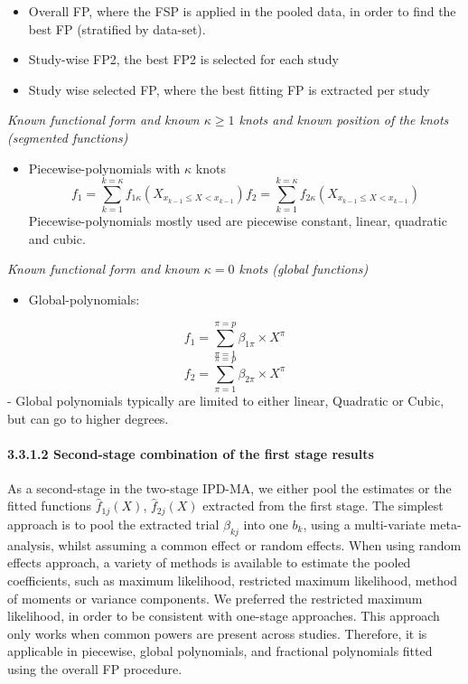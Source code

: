 \documentclass[14pt,]{article}
\providecommand{\tightlist}{%
  \setlength{\itemsep}{0pt}\setlength{\parskip}{0pt}}
\let\oldparagraph\paragraph
\renewcommand{\paragraph}[1]{\oldparagraph{#1}\mbox{}}
\begin{document}
\begin{itemize}
\tightlist
\item
  Overall FP, where the FSP is applied in the pooled data, in order to
  find the best FP (stratified by data-set).
\item
  Study-wise FP2, the best FP2 is selected for each study
\item
  Study wise selected FP, where the best fitting FP is extracted per
  study
\end{itemize}

\emph{Known functional form and known \(\kappa \geq 1\) knots and known
position of the knots (segmented functions)}

\begin{itemize}
\tightlist
\item
  Piecewise-polynomials with \(\kappa\) knots
  \[f_1 = \sum_{k =1}^{ k= \kappa}f_{1\kappa}(X_{x_{k-1} \leq X < x_{k-1}} ) f_2 =  \sum_{k =1}^{k= \kappa}f_{2\kappa}(X_{x_{k-1} \leq X < x_{k-1}} )\]
  Piecewise-polynomials mostly used are piecewise constant, linear,
  quadratic and cubic.
\end{itemize}

\emph{Known functional form and known \(\kappa = 0\) knots (global
functions)}

\begin{itemize}
\tightlist
\item
  Global-polynomials:
\end{itemize}

\[f_1 =  \sum_{\pi=1}^{\pi=p} \beta_{1\pi} \times X^{\pi}\]
\[ f_2 = \sum_{\pi=1}^{\pi=p} \beta_{2\pi} \times X^{\pi}\] - Global
polynomials typically are limited to either linear, Quadratic or Cubic,
but can go to higher degrees.

\hypertarget{second-stage-combination-of-the-first-stage-results}{%
\paragraph{3.3.1.2 Second-stage combination of the first stage
results}\label{second-stage-combination-of-the-first-stage-results}}

As a second-stage in the two-stage IPD-MA, we either pool the estimates
or the fitted functions \(\hat f_{1j}(X)\), \(\hat f_{2j}(X)\) extracted
from the first stage. The simplest approach is to pool the extracted
trial \(\beta_{kj}\) into one \(b_k\), using a multi-variate
meta-analysis, whilst assuming a common effect or random effects. When
using random effects approach, a variety of methods is available to
estimate the pooled coefficients, such as maximum likelihood, restricted
maximum likelihood, method of moments or variance components. We
preferred the restricted maximum likelihood, in order to be consistent
with one-stage approaches. This approach only works when common powers
are present across studies. Therefore, it is applicable in piecewise,
global polynomials, and fractional polynomials fitted using the overall
FP procedure.
\end{document}
